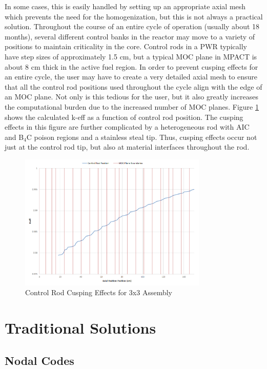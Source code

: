 In some cases, this is easily handled by setting up an appropriate axial mesh which prevents the need for the homogenization, but this is not always a practical solution.  Throughout the course of an entire cycle of operation (usually about 18 months), several different control banks in the reactor may move to a variety of positions to maintain criticality in the core.  Control rods in a PWR typically have step sizes of approximately 1.5 cm, but a typical MOC plane in MPACT is about 8 cm thick in the active fuel region.  In order to prevent cusping effects for an entire cycle, the user may have to create a very detailed axial mesh to ensure that all the control rod positions used throughout the cycle align with the edge of an MOC plane.  Not only is this tedious for the user, but it also greatly increases the computational burden due to the increased number of MOC planes.  Figure \ref{f:p4cuspingEffects} shows the calculated k-eff as a function of control rod position.  The cusping effects in this figure are further complicated by a heterogeneous rod with AIC and B$_4$C poison regions and a stainless steal tip.  Thus, cusping effects occur not just at the control rod tip, but also at material interfaces throughout the rod.

\begin{figure}
    \centering
    \includegraphics[width=0.8\textwidth]{figs/p4cuspingEffects.png}
    \caption{Control Rod Cusping Effects for 3x3 Assembly}\label{f:p4cuspingEffects}
\end{figure}

\section{Traditional Solutions}

\subsection{Nodal Codes}

